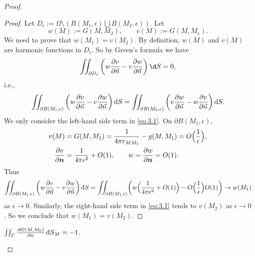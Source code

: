 \begin{proof}
  \begin{proof}
    Let $D_{\epsilon}:=\varOmega\setminus(B(M_1,\epsilon)\bigcup B(M_2,\epsilon))$.
    Let
    \[ w(M):=G(M,M_2), \qquad v(M):=G(M,M_1). \]
    We need to prove that $w(M_1)=v(M_2)$.
    By definition, $w(M)$ and $v(M)$ are harmonic functions in $D_{\epsilon}$.
    So by Green's formula we have
    \[ \iint_{\partial D_{\epsilon}}\left(w\frac{\partial v}{\partial\vec{n}}
      -v\frac{\partial w}{\partial\vec{n}}\right)\d S = 0, \]
    i.e.,
    \begin{equation}\label{eq:3.}
      \iint_{\partial B(M_1,\epsilon)}
      \left(w\frac{\partial v}{\partial\vec{n}}-v\frac{\partial w}{\partial\vec{n}}\right)\mathop{}\!\mathrm{d} S
      = \iint_{\partial B(M_2,\epsilon)}
        \left(v\frac{\partial w}{\partial\vec{n}}-w\frac{\partial v}{\partial\vec{n}}\right)\mathop{}\!\mathrm{d} S.
    \end{equation}
    We only consider the left-hand side term in \eqref{eq:3.1}.
    On $\partial B(M_1,\epsilon)$,
    \begin{align*}
      v(M) & = G(M,M_1) = \frac{1}{4\pi r_{MM_1}} -g(M,M_1) = O\Bigl(\frac{1}{\epsilon}\Bigr), \\
      \frac{\partial v}{\partial\bm{n}} & = \frac{1}{4\pi\epsilon^2} + O(1), \qquad
      w = \frac{\partial w}{\partial\bm{n}} = O(1).
    \end{align*}
    Thus
    \[ \iint_{\partial B(M_1,\epsilon)}
      \left(w\frac{\partial v}{\partial\vec{n}}-v\frac{\partial w}{\partial\vec{n}}\right)\mathop{}\!\mathrm{d} S
      = \iint_{\partial B(M_1,\epsilon)} \biggl(w\Bigl(\frac{1}{4\pi\epsilon^2} + O(1)\Bigr)
          - O\Bigl(\frac{1}{\epsilon}\Bigr)O(1)\biggr)
      \to w(M_1)\]
    as $\epsilon\to 0$. Similarly, the right-hand side term in \eqref{eq:3.1}
    tends to $v(M_2)$ as $\epsilon\to 0$. So we conclude that $w(M_1)=v(M_2)$.
  \end{proof}

  \begin{property}
    $\iint_{\varGamma} \frac{\partial G(M, M_0)}{\partial n} \mathop{}\!\mathrm{d} S_M = -1$.

  \end{property}
  

\end{proof}
